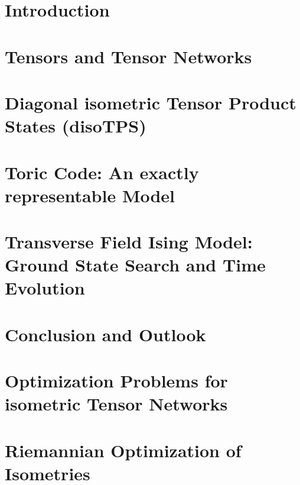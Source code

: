 \documentclass[encoding=utf8,british]{template/thesis}
\begin{document}
	\chapter{Introduction}
	\label{chap:introduction}
	
	
	\chapter{Tensors and Tensor Networks}
	\label{chap:tensors_and_tensor_networks}
	
	
	\chapter{Diagonal isometric Tensor Product States (disoTPS)}
	\label{chap:disoTPS}
	
	
	\chapter{Toric Code: An exactly representable Model}
	\label{chap:toric_code}
	
	
	\chapter{Transverse Field Ising Model: Ground State Search and Time Evolution}
	\label{chap:TFI}
	
	
	\chapter{Conclusion and Outlook}
	\label{chap:summary}
	
	
	\appendix
	
	\chapter{Optimization Problems for isometric Tensor Networks}
	\label{app:optimization_problems_for_isometric_tensor_networks}
	
	
	\chapter{Riemannian Optimization of Isometries}
	\label{app:riemannian_optimization_of_isometries}
	
	
\end{document}
